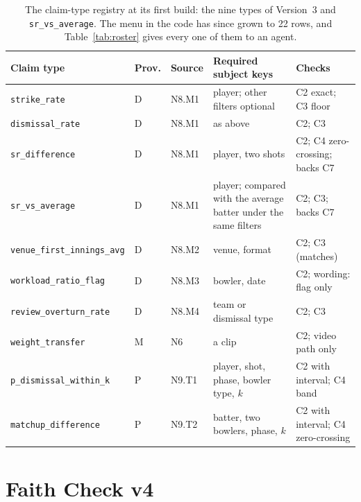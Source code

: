 \documentclass[11pt,a4paper]{article}
\begin{document}
\begin{table}[htbp]
\centering
\footnotesize
\renewcommand{\arraystretch}{1.2}
\begin{tabular}{@{}>{\raggedright\arraybackslash}p{4.3cm}
                  >{\raggedright\arraybackslash}p{1.0cm}
                  >{\raggedright\arraybackslash}p{1.3cm}
                  >{\raggedright\arraybackslash}p{4.2cm}
                  >{\raggedright\arraybackslash}p{4.1cm}@{}}
\toprule
\textbf{Claim type} & \textbf{Prov.} & \textbf{Source} & \textbf{Required subject keys} & \textbf{Checks} \\
\midrule
\texttt{strike\_rate} & D & N8.M1 & player; other filters optional & C2 exact; C3 floor \\
\texttt{dismissal\_rate} & D & N8.M1 & as above & C2; C3 \\
\texttt{sr\_difference} & D & N8.M1 & player, two shots & C2; C4 zero-crossing; backs C7 \\
\texttt{sr\_vs\_average} & D & N8.M1 & player; compared with the average batter under the same filters & C2; C3; backs C7 \\
\texttt{venue\_first\_innings\_avg} & D & N8.M2 & venue, format & C2; C3 (matches) \\
\texttt{workload\_ratio\_flag} & D & N8.M3 & bowler, date & C2; wording: flag only \\
\texttt{review\_overturn\_rate} & D & N8.M4 & team or dismissal type & C2; C3 \\
\texttt{weight\_transfer} & M & N6 & a clip & C2; video path only \\
\texttt{p\_dismissal\_within\_k} & P & N9.T1 & player, shot, phase, bowler type, $k$ & C2 with interval; C4 band \\
\texttt{matchup\_difference} & P & N9.T2 & batter, two bowlers, phase, $k$ & C2 with interval; C4 zero-crossing \\
\bottomrule
\end{tabular}
\caption{The claim-type registry at its first build: the nine types of
Version~3 and \texttt{sr\_vs\_average}. The menu in the code has since grown to
22 rows, and Table~\ref{tab:roster} gives every one of them to an agent.}
\label{tab:registry}
\end{table}

\section{Faith Check v4}
\label{sec:faith}
\end{document}
